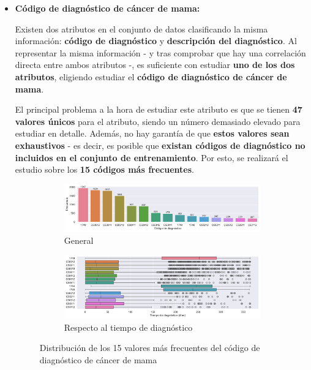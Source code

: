 \begin{itemize}[leftmargin=*]
	\item \textbf{Código de diagnóstico de cáncer de mama:}
	
	Existen dos atributos en el conjunto de datos clasificando la misma información: \textbf{código de diagnóstico} y \textbf{descripción del diagnóstico}. Al representar la misma información - y tras comprobar que hay una correlación directa entre ambos atributos -, es suficiente con estudiar \textbf{uno de los dos atributos}, eligiendo estudiar el \textbf{código de diagnóstico de cáncer de mama}.
	
	El principal problema a la hora de estudiar este atributo es que se tienen \textbf{47 valores únicos} para el atributo, siendo un número demasiado elevado para estudiar en detalle. Además, no hay garantía de que \textbf{estos valores sean exhaustivos} - es decir, es posible que \textbf{existan códigos de diagnóstico no incluidos en el conjunto de entrenamiento}. Por esto, se realizará el estudio sobre los \textbf{15 códigos más frecuentes}.
	
	\begin{figure}[h]
		\begin{center}
			\begin{subfigure}{\linewidth}
				\begin{center}
					\includegraphics[width=0.9\linewidth]{figs/chapter3/categorical/bcdistribution}
					\caption{General}\label{fig:ch3bcdist}
				\end{center}
			\end{subfigure} 
			\begin{subfigure}{\linewidth}
				\begin{center}
					\includegraphics[width=0.9\linewidth]{figs/chapter3/categorical/bcperiod}
					\caption{Respecto al tiempo de diagnóstico}\label{fig:ch3bcperiod}
				\end{center}
			\end{subfigure} 
		\end{center}
		\captionsetup{aboveskip=-5pt, belowskip=-15pt, justification=centering}
		\caption{Distribución de los 15 valores más frecuentes del código de diagnóstico de cáncer de mama}
		\label{fig:ch3bc}
	\end{figure}
	

\end{itemize}
